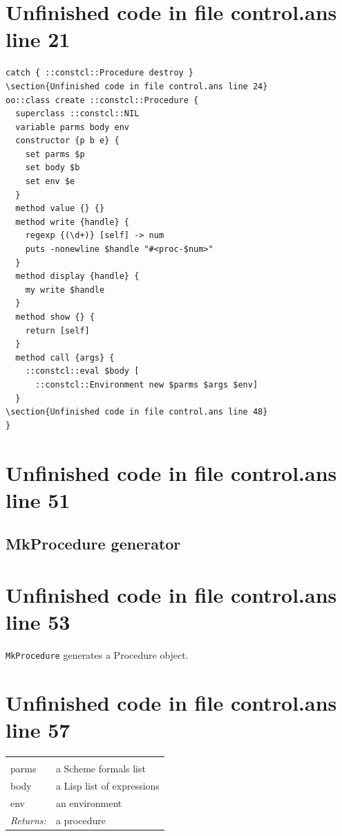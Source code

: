 \documentclass[twoside,9pt]{report}
\begin{document}
\section{Unfinished code in file control.ans line 21}
\begin{lstlisting}
catch { ::constcl::Procedure destroy }
\section{Unfinished code in file control.ans line 24}
oo::class create ::constcl::Procedure {
  superclass ::constcl::NIL
  variable parms body env
  constructor {p b e} {
    set parms $p
    set body $b
    set env $e
  }
  method value {} {}
  method write {handle} {
    regexp {(\d+)} [self] -> num
    puts -nonewline $handle "#<proc-$num>"
  }
  method display {handle} {
    my write $handle
  }
  method show {} {
    return [self]
  }
  method call {args} {
    ::constcl::eval $body [
      ::constcl::Environment new $parms $args $env]
  }
\section{Unfinished code in file control.ans line 48}
}
\end{lstlisting}
\section{Unfinished code in file control.ans line 51}
\subsection{MkProcedure generator}
\label{mkprocedure-generator}
\section{Unfinished code in file control.ans line 53}


\texttt{MkProcedure} generates a Procedure object.

\section{Unfinished code in file control.ans line 57}
\noindent\begin{tabular}{ |p{1.9cm} p{8cm}| }
\hline
\rowcolor[HTML]{CCCCCC} \multicolumn{2}{|l|}{\bf MkProcedure (internal)} \\
parms & a Scheme formals list \\
body & a Lisp list of expressions \\
env & an environment \\
\textit{Returns:} & a procedure \\
\hline
\end{tabular}
\end{document}

